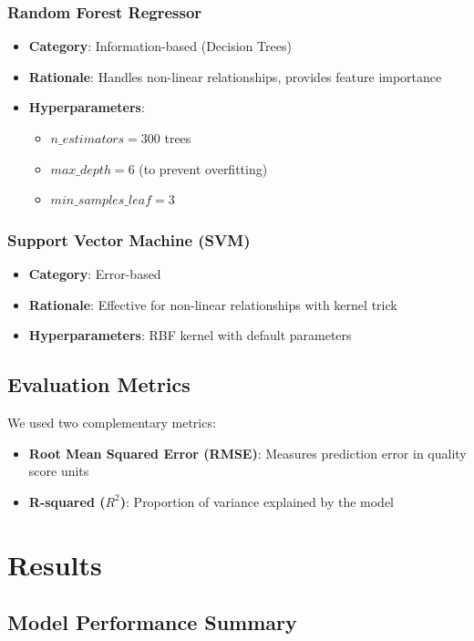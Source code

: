 \documentclass[12pt]{article}
\begin{document}
\subsubsection{Random Forest Regressor}
\begin{itemize}
    \item \textbf{Category}: Information-based (Decision Trees)
    \item \textbf{Rationale}: Handles non-linear relationships, provides feature importance
    \item \textbf{Hyperparameters}:
    \begin{itemize}
        \item $n\_estimators = 300$ trees
        \item $max\_depth = 6$ (to prevent overfitting)
        \item $min\_samples\_leaf = 3$
    \end{itemize}
\end{itemize}

\subsubsection{Support Vector Machine (SVM)}
\begin{itemize}
    \item \textbf{Category}: Error-based
    \item \textbf{Rationale}: Effective for non-linear relationships with kernel trick
    \item \textbf{Hyperparameters}: RBF kernel with default parameters
\end{itemize}

\subsection{Evaluation Metrics}
We used two complementary metrics:
\begin{itemize}
    \item \textbf{Root Mean Squared Error (RMSE)}: Measures prediction error in quality score units
    \item \textbf{R-squared ($R^2$)}: Proportion of variance explained by the model
\end{itemize}

\section{Results}

\subsection{Model Performance Summary}
\end{document}
